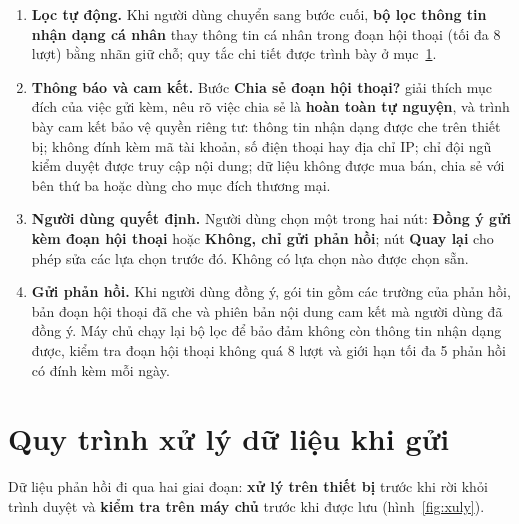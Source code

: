 \documentclass[11pt,a4paper]{article}
\begin{document}
\begin{enumerate}[leftmargin=*]
\item \textbf{Lọc tự động.} Khi người dùng chuyển sang bước cuối, \textbf{bộ lọc thông tin nhận dạng cá nhân}
  thay thông tin cá nhân trong đoạn hội thoại (tối đa 8 lượt) bằng nhãn giữ chỗ; quy tắc chi tiết được trình bày
  ở mục~\ref{sec:xuly}.
\item \textbf{Thông báo và cam kết.} Bước \textbf{Chia sẻ đoạn hội thoại?} giải thích mục đích của việc gửi kèm,
  nêu rõ việc chia sẻ là \textbf{hoàn toàn tự nguyện}, và trình bày cam kết bảo vệ quyền riêng tư: thông tin nhận
  dạng được che trên thiết bị; không đính kèm mã tài khoản, số điện thoại hay địa chỉ IP; chỉ đội ngũ kiểm duyệt
  được truy cập nội dung; dữ liệu không được mua bán, chia sẻ với bên thứ ba hoặc dùng cho mục đích thương mại.
\item \textbf{Người dùng quyết định.} Người dùng chọn một trong hai nút: \textbf{Đồng ý gửi kèm đoạn hội thoại}
  hoặc \textbf{Không, chỉ gửi phản hồi}; nút \textbf{Quay lại} cho phép sửa các lựa chọn trước đó. Không có lựa
  chọn nào được chọn sẵn.
\item \textbf{Gửi phản hồi.} Khi người dùng đồng ý, gói tin gồm các trường của phản hồi, bản đoạn hội thoại đã che
  và phiên bản nội dung cam kết mà người dùng đã đồng ý. Máy chủ chạy lại bộ lọc để bảo đảm không còn thông tin
  nhận dạng được, kiểm tra đoạn hội thoại không quá 8 lượt và giới hạn tối đa 5 phản hồi có đính kèm mỗi ngày.
\end{enumerate}

\newpage
\section{Quy trình xử lý dữ liệu khi gửi}
\label{sec:xuly}

Dữ liệu phản hồi đi qua hai giai đoạn: \textbf{xử lý trên thiết bị} trước khi rời khỏi trình duyệt và
\textbf{kiểm tra trên máy chủ} trước khi được lưu (hình~\ref{fig:xuly}).
\end{document}
